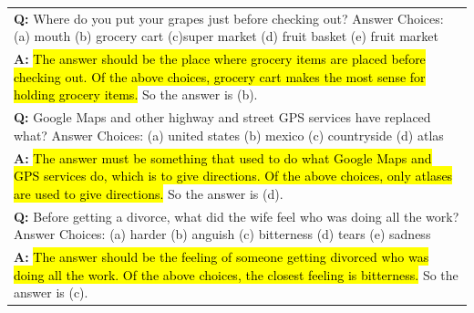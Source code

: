 \begin{table}[H]
\begin{tabular}{p{\linewidth}}
        \vspace{0mm}
        \textbf{Q:} Where do you put your grapes just before checking out? Answer Choices: (a) mouth (b) grocery cart (c)super market (d) fruit basket (e) fruit market\\
        \vspace{-1mm}
        \textbf{A:} \hl{The answer should be the place where grocery items are placed before checking out. Of the above choices, grocery cart makes the most sense for holding grocery items.} So the answer is (b). \\
        \vspace{0mm}
        \textbf{Q:} Google Maps and other highway and street GPS services have replaced what? Answer Choices: (a) united states (b) mexico (c) countryside (d) atlas \\
        \vspace{-1mm}
        \textbf{A:} \hl{The answer must be something that used to do what Google Maps and GPS services do, which is to give directions. Of the above choices, only atlases are used to give directions.} So the answer is (d). \\
        \vspace{0mm}
        \textbf{Q:} Before getting a divorce, what did the wife feel who was doing all the work? Answer Choices: (a) harder (b) anguish (c) bitterness (d) tears (e) sadness \\
        \vspace{-1mm}
        \textbf{A:} \hl{The answer should be the feeling of someone getting divorced who was doing all the work. Of the above choices, the closest feeling is bitterness.} So the answer is (c). \\
        \bottomrule
    \end{tabular}
    \label{tab:appendix-commonsenseqa-prompt}
\end{table}
\endgroup